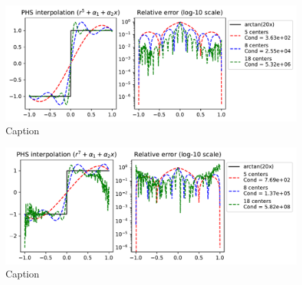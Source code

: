 \documentclass[12pt]{report} %
\begin{document}
\begin{figure}[ht]
    \centering
    \includegraphics[width=\textwidth]{imagenes/phs_interpolation/sign_r5_deg1.pdf}
    \caption{Caption}
    \label{fig:sign-r5-deg1}
\end{figure}

\begin{figure}[ht]
    \centering
    \includegraphics[width=\textwidth]{imagenes/phs_interpolation/sign_r7_deg1.pdf}
    \caption{Caption}
    \label{fig:sign-r7-deg1}
\end{figure}





    
\end{document}
